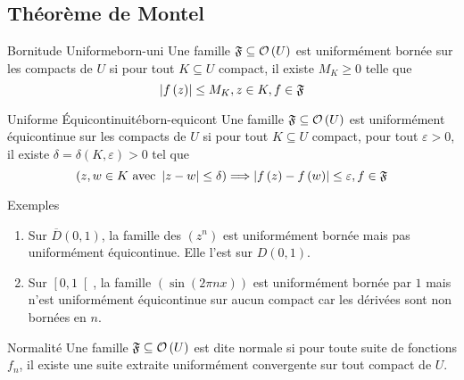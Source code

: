 \documentclass{cours}
\begin{document}
\subsection{Théorème de Montel}
\begin{définition}{Bornitude Uniforme}{born-uni}
	Une famille $\mathfrak{F} \subseteq \mathcal{O}\left(U\right)$ est uniformément bornée sur les compacts de $U$ si pour tout $K \subseteq U$ compact, il existe $M_{K} \geq 0$ telle que 
	\begin{equation*}
		\left|f\left(z\right)\right| \leq M_{K}, z\in K, f \in \mathfrak{F}
	\end{equation*}
\end{définition}

\begin{définition}{Uniforme Équicontinuité}{born-equicont}
	Une famille $\mathfrak{F}\subseteq \mathcal{O}\left(U\right)$ est uniformément équicontinue sur les compacts de $U$ si pour tout $K \subseteq U$ compact, pour tout $\varepsilon > 0$, il existe $\delta = \delta\left(K, \varepsilon\right) > 0$ tel que 
	\begin{equation*}
		\left(z, w \in K \text{ avec } \left|z - w\right| \leq \delta\right) \Longrightarrow \left|f\left(z\right) - f\left(w\right)\right| \leq \varepsilon, f\in \mathfrak{F}
	\end{equation*}

	
\end{définition}


\begin{propositionfr}{Exemples}{}
		\begin{enumerate}
			\item Sur $\overline{D}\left(0, 1\right)$, la famille des $\left(z^{n}\right)$ est uniformément bornée mais pas uniformément équicontinue. Elle l'est sur $D\left(0, 1\right)$.
			\item Sur $\left[0, 1\right[$, la famille $\left(\sin\left(2\pi nx\right)\right)$ est uniformément bornée par $1$ mais n'est uniformément équicontinue sur aucun compact car les dérivées sont non bornées en $n$. 
	\end{enumerate}

\end{propositionfr}

\begin{définition}{Normalité}{}
	Une famille $\mathfrak{F} \subseteq \mathcal{O}\left(U\right)$ est dite normale si pour toute suite de fonctions $f_{n}$, il existe une suite extraite uniformément convergente sur tout compact de $U$. 
	
\end{définition}
\end{document}
